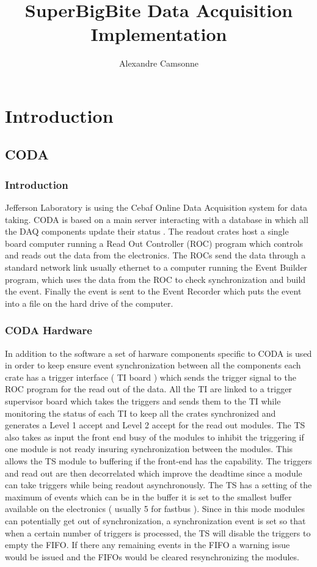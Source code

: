 \documentclass{article}
\title {SuperBigBite Data Acquisition Implementation}
\author{Alexandre Camsonne}
\begin{document}
\section{Introduction}
\subsection{CODA}
\subsubsection{Introduction}
Jefferson Laboratory is using the Cebaf Online Data Acquisition system for data taking.
CODA is based on a main server interacting with a database in which all the DAQ components update their status . The readout crates host a single board computer running a Read Out Controller (ROC) program which controls and reads out the data from the electronics. The ROCs send the data through a standard network link usually ethernet to a computer running the Event Builder program, which uses the data from the ROC to check synchronization and build the event. Finally the event is sent to the Event Recorder which puts the event into a file on the hard drive of the computer.
\subsubsection{CODA Hardware}
In addition to the software a set of harware components specific to CODA is used in order to keep ensure event synchronization between all the components each crate has a trigger interface ( TI board ) which sends the trigger signal to the ROC program for the read out of the data. All the TI are linked to a trigger supervisor board which takes the triggers and sends them to the TI while monitoring the status of each TI to keep all the crates synchronized and generates a Level 1 accept and Level 2 accept for the read out modules. The TS also takes as input the front end busy of the modules to inhibit the triggering if one module is not ready insuring synchronization between the modules.
This allows the TS module to buffering if the front-end has the capability. The triggers and read out are then decorrelated which improve the deadtime since a module can take triggers while being readout asynchronously. The TS has a setting of the maximum of events which can be in the buffer it is set to the smallest buffer available on the electronics ( usually 5 for fastbus ). Since in this mode modules can potentially get out of synchronization, a synchronization event is set so that when a certain number of triggers is processed, the TS will disable the triggers to empty the FIFO. If there any remaining events in the FIFO a warning issue would be issued and the FIFOs would be cleared resynchronizing the modules.
  
\end{document}
